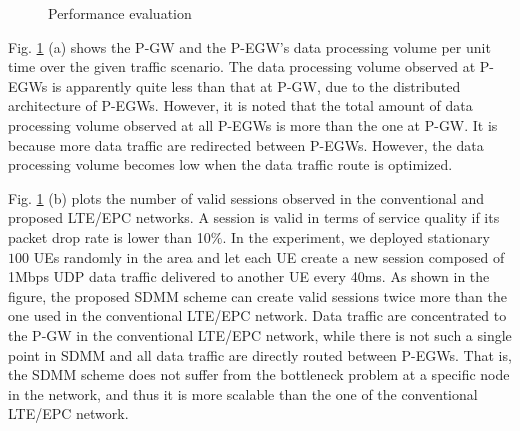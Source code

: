 \documentclass[runningheads,a4paper]{llncs}
\begin{document}
\begin{figure}[t] 
\centering 
{}
\vspace{-0.3cm}
\caption{Performance evaluation}
\label{fig:3}\vspace{-0.6cm}
\end{figure}

Fig. \ref{fig:3} (a) shows the P-GW and the P-EGW's data processing volume per unit time over the given traffic scenario. The data processing volume observed at P-EGWs is apparently quite less than that at P-GW, due to the distributed architecture of P-EGWs. However, it is noted that the total amount of data processing volume observed at all P-EGWs is more than the one at P-GW. It is because more data traffic are redirected between P-EGWs. However, the data processing volume becomes low when the data traffic route is optimized.

Fig. \ref{fig:3} (b) plots the number of valid sessions observed in the conventional and proposed LTE/EPC networks. A session is valid in terms of service quality if its packet drop rate is lower than 10$\%$. In the experiment, we deployed stationary $100$ UEs randomly in the area and let each UE create a new session composed of 1Mbps UDP data traffic delivered to another UE every 40ms. As shown in the figure, the proposed SDMM scheme can create valid sessions twice more than the one used in the conventional LTE/EPC network. Data traffic are concentrated to the P-GW in the conventional LTE/EPC network, while there is not such a single point in SDMM and all data traffic are directly routed between P-EGWs. That is, the SDMM scheme does not suffer from the bottleneck problem at a specific node in the network, and thus it is more scalable than the one of the conventional LTE/EPC network. 
\end{document}
